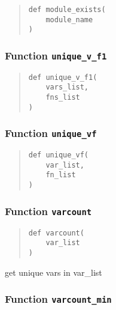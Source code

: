 \documentclass[english,a4paper,oneside]{article}
\begin{document}
\begin{quote}
\begin{verbatim}
def module_exists(
    module_name
)
\end{verbatim}
\end{quote}

\hypertarget{nBodyCoupling.unique_v_f1}{%
\subsubsection{\texorpdfstring{Function
\texttt{unique\_v\_f1}}{Function unique\_v\_f1}}\label{nBodyCoupling.unique_v_f1}}

\begin{quote}
\begin{verbatim}
def unique_v_f1(
    vars_list,
    fns_list
)
\end{verbatim}
\end{quote}

\hypertarget{nBodyCoupling.unique_vf}{%
\subsubsection{\texorpdfstring{Function
\texttt{unique\_vf}}{Function unique\_vf}}\label{nBodyCoupling.unique_vf}}

\begin{quote}
\begin{verbatim}
def unique_vf(
    var_list,
    fn_list
)
\end{verbatim}
\end{quote}

\hypertarget{nBodyCoupling.varcount}{%
\subsubsection{\texorpdfstring{Function
\texttt{varcount}}{Function varcount}}\label{nBodyCoupling.varcount}}

\begin{quote}
\begin{verbatim}
def varcount(
    var_list
)
\end{verbatim}
\end{quote}

get unique vars in var\_list

\hypertarget{nBodyCoupling.varcount_min}{%
\subsubsection{\texorpdfstring{Function
\texttt{varcount\_min}}{Function varcount\_min}}\label{nBodyCoupling.varcount_min}}
\end{document}

